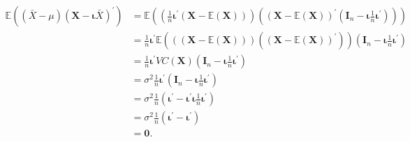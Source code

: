 \documentclass{tstextbook}
\begin{document}
\begin{example}
\begin{align*}
	\mathbb{E}\left(\left(\bar{X}-\mu\right)\left(\textbf{X}-\boldsymbol{\iota}\bar{X}\right)^{\prime}\right) & =\mathbb{E}\left(\left(\frac{1}{n}\boldsymbol{\iota}^{\prime}\left(\textbf{X}-\mathbb{E}(\textbf{X})\right)\right)\left(\left(\textbf{X}-\mathbb{E}(\textbf{X})\right)^{\prime}\left(\textbf{I}_{n}-\boldsymbol{\iota}\frac{1}{n}\boldsymbol{\iota}^{\prime}\right)\right)\right)\\
	& =\frac{1}{n}\boldsymbol{\iota}^{\prime}\mathbb{E}\left(\left(\left(\textbf{X}-\mathbb{E}(\textbf{X})\right)\right)\left(\left(\textbf{X}-\mathbb{E}(\textbf{X})\right)^{\prime}\right)\right)\left(\textbf{I}_{n}-\boldsymbol{\iota}\frac{1}{n}\boldsymbol{\iota}^{\prime}\right)\\
	& =\frac{1}{n}\boldsymbol{\iota}^{\prime}VC(\textbf{X})\left(\textbf{I}_{n}-\boldsymbol{\iota}\frac{1}{n}\boldsymbol{\iota}^{\prime}\right)\\
	& =\sigma^{2}\frac{1}{n}\boldsymbol{\iota}^{\prime}\left(\textbf{I}_{n}-\boldsymbol{\iota}\frac{1}{n}\boldsymbol{\iota}^{\prime}\right)\\
	& =\sigma^{2}\frac{1}{n}\left(\boldsymbol{\iota}^{\prime}-\boldsymbol{\iota}^{\prime}\boldsymbol{\iota}\frac{1}{n}\boldsymbol{\iota}^{\prime}\right)\\
	& =\sigma^{2}\frac{1}{n}\left(\boldsymbol{\iota}^{\prime}-\boldsymbol{\iota}^{\prime}\right)\\
	& =\boldsymbol{0}.
\end{align*}



\end{example}
\end{document}
